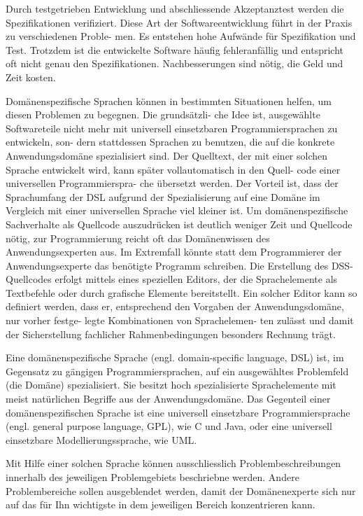\documentclass[11pt,english,ngerman, headsepline]{scrreprt}
\begin{document}
Durch testgetrieben Entwicklung und abschliessende Akzeptanztest werden die
Spezifikationen verifiziert.
Diese Art der Softwareentwicklung führt in der Praxis zu verschiedenen Proble-
men. Es entstehen hohe Aufwände für Spezifikation und Test. Trotzdem ist die
entwickelte Software häufig fehleranfällig und entspricht oft nicht genau den
Spezifikationen. Nachbesserungen sind nötig, die Geld und Zeit kosten.
 
Domänenspezifische Sprachen können in bestimmten Situationen helfen, um diesen
Problemen zu begegnen. Die grundsätzli- che Idee ist, ausgewählte Softwareteile
nicht mehr mit universell einsetzbaren Programmiersprachen zu entwickeln, son-
dern stattdessen Sprachen zu benutzen, die auf die konkrete Anwendungsdomäne
spezialisiert sind. Der Quelltext, der mit einer solchen Sprache entwickelt
wird, kann später vollautomatisch in den Quell- code einer universellen
Programmierspra- che übersetzt werden. Der Vorteil ist, dass der Sprachumfang
der DSL aufgrund der Spezialisierung auf eine Domäne im Vergleich mit einer
universellen Sprache viel kleiner ist. Um domänenspezifische Sachverhalte als
Quellcode auszudrücken ist deutlich weniger Zeit und Quellcode nötig, zur
Programmierung reicht oft das  Domänenwissen des Anwendungsexperten aus. Im
Extremfall könnte statt dem Programmierer der Anwendungsexperte das benötigte
Programm schreiben. Die Erstellung des DSS-Quellcodes erfolgt mittels eines
speziellen Editors, der die Sprachelemente als Textbefehle oder durch grafische
Elemente bereitstellt.
Ein solcher Editor kann so definiert werden, dass er, entsprechend den Vorgaben
der Anwendungsdomäne, nur vorher festge- legte Kombinationen von Sprachelemen-
ten zulässt und damit der Sicherstellung fachlicher Rahmenbedingungen besonders
Rechnung trägt.\cite{uniLeipzigTechRadar}

  Eine domänenspezifische Sprache (engl. domain-specific language, DSL) ist, im
Gegensatz zu gängigen Programmiersprachen, auf ein ausgewähltes
 Problemfeld (die Domäne) spezialisiert. Sie besitzt hoch spezialisierte
Sprachelemente mit meist natürlichen Begriffe aus der Anwendungsdomäne.
Das Gegenteil einer domänenspezifischen Sprache ist eine universell einsetzbare
Programmiersprache (engl. general purpose language, GPL), wie C und Java, oder
eine universell einsetzbare Modellierungssprache, wie UML.

Mit Hilfe einer solchen Sprache können ausschliesslich Problembeschreibungen
innerhalb des jeweiligen Problemgebiets beschriebne werden.
Andere Problembereiche sollen ausgeblendet werden, damit der Domänenexperte sich
nur auf das für Ihn wichtigste in dem jeweiligen Bereich konzentrieren kann.
\end{document}
